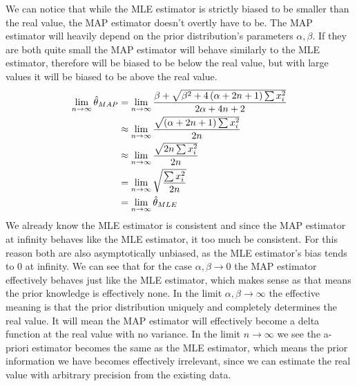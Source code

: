 We can notice that while the MLE estimator is strictly biased to be smaller than the real value, the MAP estimator doesn't overtly have to be. The MAP estimator will heavily depend on the prior distribution's parameters $\alpha,\beta$. If they are both quite small the MAP estimator will behave similarly to the MLE estimator, therefore will be biased to be below the real value, but with large values it will be biased to be above the real value.
\begin{align}
	\lim\limits_{n\rightarrow\infty} \hat\theta_{MAP} &= \lim\limits_{n\rightarrow\infty}\frac{\beta+\sqrt{\beta^2+4\left(\alpha+2n+1\right)\sum x_i^2}}{2\alpha+4n+2}\\
	&\approx \lim\limits_{n\rightarrow\infty}\frac{\sqrt{\left(\alpha+2n+1\right)\sum x_i^2}}{2n}\\
	&\approx \lim\limits_{n\rightarrow\infty}\frac{\sqrt{2n\sum x_i^2}}{2n}\\
	&= \lim\limits_{n\rightarrow\infty}\sqrt{\frac{\sum x_i^2}{2n}}\\
	&= \lim\limits_{n\rightarrow\infty} \hat\theta_{MLE}
\end{align}
We already know the MLE estimator is consistent and since the MAP estimator at infinity behaves like the MLE estimator, it too much be consistent. For this reason both are also asymptotically unbiased, as the MLE estimator's bias tends to 0 at infinity. We can see that for the case $\alpha,\beta\rightarrow0$ the MAP estimator effectively behaves just like the MLE estimator, which makes sense as that means the prior knowledge is effectively none. In the limit $\alpha,\beta\rightarrow\infty$ the effective meaning is that the prior distribution uniquely and completely determines the real value. It will mean the MAP estimator will effectively become a delta function at the real value with no variance. In the limit $n \rightarrow \infty$ we see the a-priori estimator becomes the same as the MLE estimator, which means the prior information we have becomes effectively irrelevant, since we can estimate the real value with arbitrary precision from the existing data.